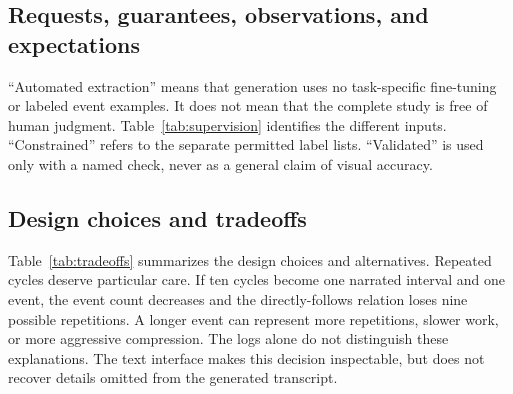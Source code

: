 \subsection{Requests, guarantees, observations, and expectations}
\label{sec:guarantees}
\label{sec:supervision}

``Automated extraction'' means that generation uses no task-specific fine-tuning or labeled event examples. It does not mean that the complete study is free of human judgment. Table~\ref{tab:supervision} identifies the different inputs. ``Constrained'' refers to the separate permitted label lists. ``Validated'' is used only with a named check, never as a general claim of visual accuracy.

\subsection{Design choices and tradeoffs}
Table~\ref{tab:tradeoffs} summarizes the design choices and alternatives. Repeated cycles deserve particular care. If ten cycles become one narrated interval and one event, the event count decreases and the directly-follows relation loses nine possible repetitions. A longer event can represent more repetitions, slower work, or more aggressive compression. The logs alone do not distinguish these explanations. The text interface makes this decision inspectable, but does not recover details omitted from the generated transcript.
